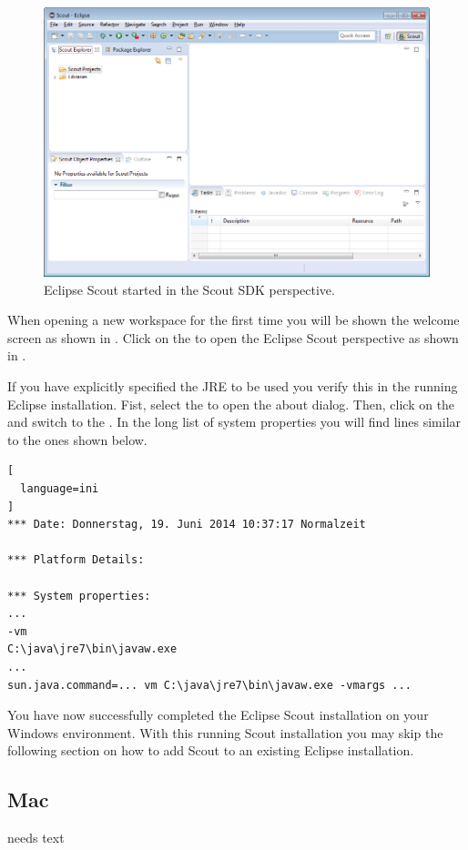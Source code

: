 \documentclass[a4paper,10pt,twoside]{book}
\begin{document}
\begin{figure}
\includegraphics[width=13cm]{scout_startup_scout_explorer.png}
\caption{Eclipse Scout started in the Scout SDK perspective. }
\end{figure}

When opening a new workspace for the first time you will be shown the welcome screen as shown in .
Click on the  to open the Eclipse Scout perspective as shown in .

If you have explicitly specified the JRE to be used you verify this in the running Eclipse installation.
Fist, select the  to open the about dialog.
Then, click on the  and switch to the .
In the long list of system properties you will find lines similar to the ones shown below.

\begin{lstlisting}[
  language=ini
]
*** Date: Donnerstag, 19. Juni 2014 10:37:17 Normalzeit

*** Platform Details:

*** System properties:
...
-vm
C:\java\jre7\bin\javaw.exe
...
sun.java.command=... vm C:\java\jre7\bin\javaw.exe -vmargs ...
\end{lstlisting}

You have now successfully completed the Eclipse Scout installation on your Windows environment.
With this running Scout installation you may skip the following section on how to add Scout to an existing Eclipse installation.

\subsection{Mac}
needs text
\end{document}
